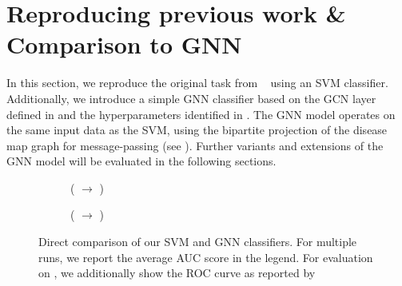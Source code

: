 \documentclass[
	fontsize=10pt, %
	twoside=true, %
	secnumdepth=1, %
  toc=indentunnumbered %
]{kaobook}
\begin{document}
\section{Reproducing previous work \& Comparison to GNN}
\label{sec:reproducing}

In this section, we reproduce the original task from
\nielsen{}~\cite{nielsen_MachineLearningSupport_2019} using an SVM classifier.
Additionally, we introduce a simple GNN classifier based on the GCN layer
defined in  and the hyperparameters identified in
. The GNN model operates on the same input data as
the SVM, using the bipartite projection of the disease map graph for
message-passing (see ). Further variants and
extensions of the GNN model will be evaluated in the following sections.




%
\begin{figure}[h]
  \centering
  \begin{subfigure}[h]{0.49\linewidth}
    \caption{(\ADMap{} $\rightarrow$ \PDMap)}
  \end{subfigure}
  \begin{subfigure}[h]{0.49\linewidth}
    \caption{(\ADMap{} $\rightarrow$ \ReconMap)}
  \end{subfigure}
  \caption{Direct comparison of our SVM and GNN classifiers. For multiple runs,
    we report the average AUC score in the legend. For evaluation on
    \ReconMap{}, we additionally show the ROC curve as reported by
    \citeauthor{nielsen_MachineLearningSupport_2019}~\cite{nielsen_MachineLearningSupport_2019} }
  \label{fig:svm-repro-results}
\end{figure}
\end{document}
